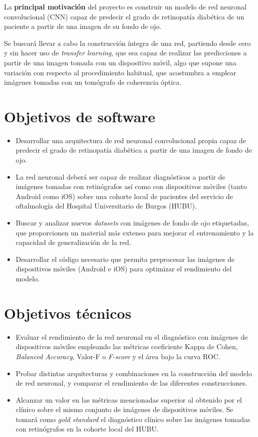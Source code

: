  \label{Obj}

La \textbf{principal motivación} del proyecto es construir un modelo de red neuronal convolucional (CNN) capaz de predecir el grado de retinopatía diabética de un paciente a partir de una imagen de su fondo de ojo.

Se buscará llevar a cabo la construcción íntegra de una red, partiendo desde cero y sin hacer uso de \textit{transfer learning}, que sea capaz de realizar las predicciones a partir de una imagen tomada con un dispositivo móvil, algo que supone una variación con respecto al procedimiento habitual, que acostumbra a emplear imágenes tomadas con un tomógrafo de coherencia óptica.

\section{Objetivos de software}
\begin{itemize}[itemsep=0.25em]
    \item Desarrollar una arquitectura de red neuronal convolucional propia capaz de predecir el grado de retinopatía diabética a partir de una imagen de fondo de ojo.
    \item La red neuronal deberá ser capaz de realizar diagnósticos a partir de imágenes tomadas con retinógrafos así como con dispositivos móviles (tanto Android como iOS) sobre una cohorte local de pacientes del servicio de oftalmología del Hospital Universitario de Burgos (HUBU).
    \item Buscar y analizar nuevos \textit{datasets} con imágenes de fondo de ojo etiquetadas, que proporcionen un material más extenso para mejorar el entrenamiento y la capacidad de generalización de la red.
    \item Desarrollar el código necesario que permita preprocesar las imágenes de dispositivos móviles (Android e iOS) para optimizar el rendimiento del modelo.
\end{itemize}

\section{Objetivos técnicos}
\begin{itemize}[itemsep=0.25em]
    \item Evaluar el rendimiento de la red neuronal en el diagnóstico con imágenes de dispositivos móviles empleando las métricas coeficiente Kappa de Cohen, \textit{Balanced Accuracy}, Valor-F o \textit{F-score} y el área bajo la curva ROC.
    \item Probar distintas arquitecturas y combinaciones en la construcción del modelo de red neuronal, y comparar el rendimiento de las diferentes construcciones. 
    \item Alcanzar un valor en las métricas mencionadas superior al obtenido por el clínico sobre el mismo conjunto de imágenes de dispositivos móviles. Se tomará como \textit{gold standard} el diagnóstico clínico sobre las imágenes tomadas con retinógrafos en la cohorte local del HUBU.
\end{itemize}

